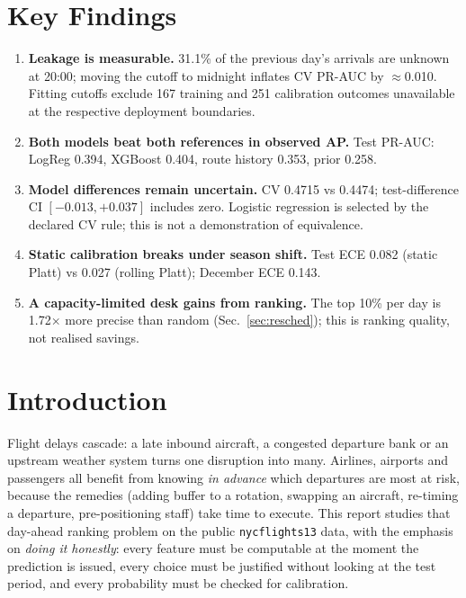 \documentclass[conference]{IEEEtran}
\begin{document}
\section*{Key Findings}
\begin{enumerate}
\item \textbf{Leakage is measurable.} 31.1\% of the previous day's arrivals are unknown at 20:00; moving the cutoff to midnight inflates CV PR-AUC by $\approx$0.010. Fitting cutoffs exclude 167 training and 251 calibration outcomes unavailable at the respective deployment boundaries.
\item \textbf{Both models beat both references in observed AP.} Test PR-AUC: LogReg 0.394, XGBoost 0.404, route history 0.353, prior 0.258.
\item \textbf{Model differences remain uncertain.} CV 0.4715 vs 0.4474; test-difference CI $[-0.013,+0.037]$ includes zero. Logistic regression is selected by the declared CV rule; this is not a demonstration of equivalence.
\item \textbf{Static calibration breaks under season shift.} Test ECE 0.082 (static Platt) vs 0.027 (rolling Platt); December ECE 0.143.
\item \textbf{A capacity-limited desk gains from ranking.} The top 10\% per day is 1.72$\times$ more precise than random (Sec.~\ref{sec:resched}); this is ranking quality, not realised savings.
\end{enumerate}

\tableofcontents
\listoffigures
\listoftables
\clearpage

\section{Introduction}\label{sec:intro}
Flight delays cascade: a late inbound aircraft, a congested departure bank or an upstream weather system turns one disruption into many. Airlines, airports and passengers all benefit from knowing \emph{in advance} which departures are most at risk, because the remedies (adding buffer to a rotation, swapping an aircraft, re-timing a departure, pre-positioning staff) take time to execute. This report studies that day-ahead ranking problem on the public \texttt{nycflights13} data, with the emphasis on \emph{doing it honestly}: every feature must be computable at the moment the prediction is issued, every choice must be justified without looking at the test period, and every probability must be checked for calibration.
\end{document}
